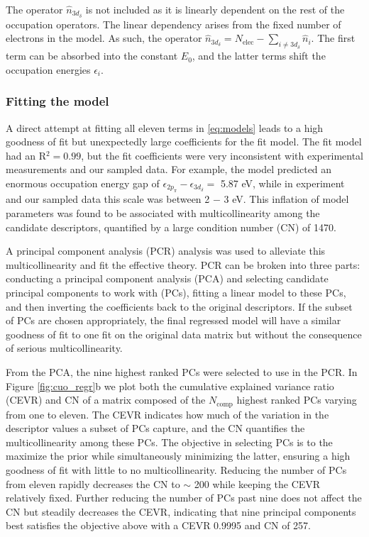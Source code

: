 \documentclass[12pt]{article}
\begin{document}
The operator $\hat{n}_{3d_\delta}$ is not included as it is linearly dependent on the rest of the occupation operators.
The linear dependency arises from the fixed number of electrons in the model.
As such, the operator $\hat{n}_{3d_\delta} = N_\text{elec} - \sum_{i \neq 3d_\delta} \hat{n}_i$.
The first term can be absorbed into the constant $E_0$, and the latter terms shift the occupation energies $\epsilon_i$.

\subsubsection{Fitting the model}
A direct attempt at fitting all eleven terms in \eqref{eq:models} leads to a high goodness of fit but unexpectedly large coefficients for the fit model.
The fit model had an R$^2= 0.99$, but the fit coefficients were very inconsistent with experimental measurements and our sampled data.
For example, the model predicted an enormous occupation energy gap of $\epsilon_{2p_\pi} - \epsilon_{3d_\delta} = $ 5.87 eV, while in experiment and our sampled data this scale was between 2 $-$ 3 eV.
This inflation of model parameters was found to be associated with multicollinearity among the candidate descriptors, quantified by a large condition number (CN) of 1470.

A principal component analysis (PCR) analysis was used to alleviate this multicollinearity and fit the effective theory.
PCR can be broken into three parts: conducting a principal component analysis (PCA) and selecting candidate principal components to work with (PCs), fitting a linear model to these PCs, and then inverting the coefficients back to the original descriptors.
If the subset of PCs are chosen appropriately, the final regressed model will have a similar goodness of fit to one fit on the original data matrix but without the consequence of serious multicollinearity.

From the PCA, the nine highest ranked PCs were selected to use in the PCR.
In Figure \eqref{fig:cuo_regr}b we plot both the cumulative explained variance ratio (CEVR) and CN of a matrix composed of the $N_\text{comp}$ highest ranked PCs varying from one to eleven.
The CEVR indicates how much of the variation in the descriptor values a subset of PCs capture, and the CN quantifies the multicollinearity among these PCs.
The objective in selecting PCs is to the maximize the prior while simultaneously minimizing the latter, ensuring a high goodness of fit with little to no multicollinearity.
Reducing the number of PCs from eleven rapidly decreases the CN to $\sim $ 200 while keeping the CEVR relatively fixed.
Further reducing the number of PCs past nine does not affect the CN but steadily decreases the CEVR, indicating that nine principal components best satisfies the objective above with a CEVR 0.9995 and CN of 257.
\end{document}
